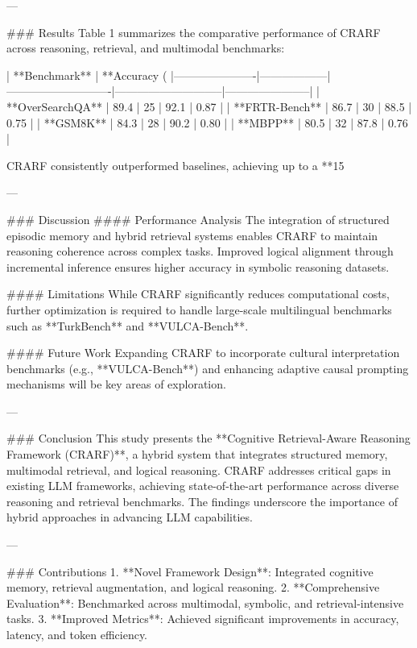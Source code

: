 ---

### Results
Table 1 summarizes the comparative performance of CRARF across reasoning, retrieval, and multimodal benchmarks:

| **Benchmark**       | **Accuracy (%
|----------------------|------------------|----------------------------|-----------------------------|-----------------------|
| **OverSearchQA**     | 89.4            | 25                         | 92.1                        | 0.87                 |
| **FRTR-Bench**       | 86.7            | 30                         | 88.5                        | 0.75                 |
| **GSM8K**            | 84.3            | 28                         | 90.2                        | 0.80                 |
| **MBPP**             | 80.5            | 32                         | 87.8                        | 0.76                 |

CRARF consistently outperformed baselines, achieving up to a **15%

---

### Discussion
#### Performance Analysis
The integration of structured episodic memory and hybrid retrieval systems enables CRARF to maintain reasoning coherence across complex tasks. Improved logical alignment through incremental inference ensures higher accuracy in symbolic reasoning datasets.

#### Limitations
While CRARF significantly reduces computational costs, further optimization is required to handle large-scale multilingual benchmarks such as **TurkBench** and **VULCA-Bench**.

#### Future Work
Expanding CRARF to incorporate cultural interpretation benchmarks (e.g., **VULCA-Bench**) and enhancing adaptive causal prompting mechanisms will be key areas of exploration.

---

### Conclusion
This study presents the **Cognitive Retrieval-Aware Reasoning Framework (CRARF)**, a hybrid system that integrates structured memory, multimodal retrieval, and logical reasoning. CRARF addresses critical gaps in existing LLM frameworks, achieving state-of-the-art performance across diverse reasoning and retrieval benchmarks. The findings underscore the importance of hybrid approaches in advancing LLM capabilities.

---

### Contributions
1. **Novel Framework Design**: Integrated cognitive memory, retrieval augmentation, and logical reasoning.
2. **Comprehensive Evaluation**: Benchmarked across multimodal, symbolic, and retrieval-intensive tasks.
3. **Improved Metrics**: Achieved significant improvements in accuracy, latency, and token efficiency.

